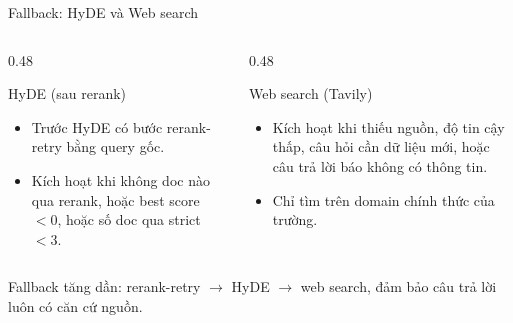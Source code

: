\documentclass[t, aspectratio=169]{beamer}
\begin{document}
	\begin{frame}{Fallback: HyDE và Web search}
		\begin{columns}[T,onlytextwidth]
			\begin{column}{0.48\textwidth}
				\begin{block}{HyDE (sau rerank)}
					\begin{itemize}
						\item Trước HyDE có bước rerank-retry bằng query gốc.
						\item Kích hoạt khi không doc nào qua rerank, hoặc best score $<0$, hoặc số doc qua strict $<3$.
					\end{itemize}
				\end{block}
			\end{column}
			\begin{column}{0.48\textwidth}
				\begin{block}{Web search (Tavily)}
					\begin{itemize}
						\item Kích hoạt khi thiếu nguồn, độ tin cậy thấp, câu hỏi cần dữ liệu mới, hoặc câu trả lời báo không có thông tin.
						\item Chỉ tìm trên domain chính thức của trường.
					\end{itemize}
				\end{block}
			\end{column}
		\end{columns}

		\vspace{0.3cm}
		\centering
		\small Fallback tăng dần: rerank-retry $\rightarrow$ HyDE $\rightarrow$ web search, đảm bảo câu trả lời luôn có căn cứ nguồn.
	\end{frame}

	\hustthankyou
\end{document}
